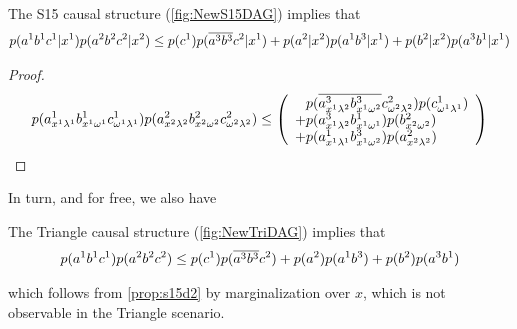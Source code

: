 \begin{prop}\label{prop:s15d2}
The S15 causal structure (\cref{fig:NewS15DAG}) implies that
\begin{align*}
p\lparen a^1 b^1 c^1|x^1\rparen p\lparen a^2 b^2 c^2|x^2\rparen
\leq
{
p\lparen c^1\rparen p\lparen\ensuremath{\overline{a^3}} \ensuremath{\overline{b^3}} c^2|x^1\rparen
+p\lparen a^2|x^2\rparen p\lparen a^1 b^3|x^1\rparen
+p\lparen b^2|x^2\rparen p\lparen a^3 b^1|x^1\rparen
}
\end{align*}
\end{prop}
\begin{proof}
\begin{align}\label{eq:s15d2structineq}
\p{a^1_{x^1 \lambda^1} b^1_{x^1 \omega^1} c^1_{\omega^1 \lambda^1}} \p{a^2_{x^2 \lambda^2} b^2_{x^2 \omega^2} c^2_{\omega^2 \lambda^2}}
\leq
\lparens{
\hphantom{+}\p{\n{a^3_{x^1 \lambda^2}} \n{b^3_{x^1 \omega^2}} c^2_{\omega^2 \lambda^2}} \p{c^1_{\omega^1 \lambda^1}}
\\+\p{a^3_{x^1 \lambda^2} b^1_{x^1 \omega^1}} \p{b^2_{x^2 \omega^2}}
\\+\p{a^1_{x^1 \lambda^1} b^3_{x^1 \omega^2}} \p{a^2_{x^2 \lambda^2}}
}\qedhere
\end{align}
\end{proof}
In turn, and for free, we also have
\begin{prop}\label{prop:trid2}
The Triangle causal structure (\cref{fig:NewTriDAG}) implies that
\begin{align*}
p\lparen a^1 b^1 c^1\rparen p\lparen a^2 b^2 c^2\rparen
\leq
{
p\lparen c^1\rparen p\lparen\ensuremath{\overline{a^3}} \ensuremath{\overline{b^3}} c^2\rparen
+p\lparen a^2\rparen p\lparen a^1 b^3\rparen
+p\lparen b^2\rparen p\lparen a^3 b^1\rparen
}
\end{align*}
\end{prop}
which follows from \cref{prop:s15d2} by marginalization over $x$, which is not observable in the Triangle scenario.

